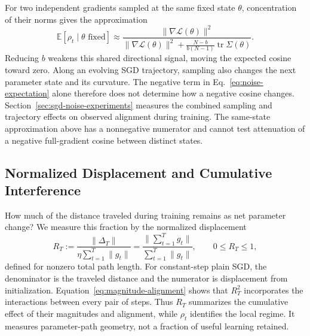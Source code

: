 For two independent gradients sampled at the same fixed state $\theta$,
concentration of their norms gives the approximation
\begin{equation}
  \mathbb E[\rho_t\mid\theta\text{ fixed}]\approx
  \frac{\|\nabla\mathcal L(\theta)\|^2}
  {\|\nabla\mathcal L(\theta)\|^2+
   \frac{N-b}{b(N-1)}\operatorname{tr}\Sigma(\theta)}.
  \label{eq:noise-cosine-approx}
\end{equation}
Reducing $b$ weakens this shared directional signal, moving the expected
cosine toward zero. Along an evolving SGD trajectory, sampling also
changes the next parameter state and its curvature. The negative term
in Eq.~\eqref{eq:noise-expectation} alone therefore does not determine
how a negative cosine changes. Section~\ref{sec:sgd-noise-experiments}
measures the combined sampling and trajectory effects on observed
alignment during training. The same-state approximation above has a
nonnegative numerator and cannot test attenuation of a negative
full-gradient cosine between distinct states.

\subsection{Normalized Displacement and Cumulative Interference}
\label{subsec:normalized-displacement}

How much of the distance traveled during training remains as net
parameter change? We measure this fraction by the normalized displacement
\begin{equation}
  R_T:=
  \frac{\|\Delta_T\|}
       {\eta\sum_{t=1}^T\|g_t\|}
  =\frac{\|\sum_{t=1}^T g_t\|}
        {\sum_{t=1}^T\|g_t\|},
  \qquad 0\leq R_T\leq1,
  \label{eq:normalized-displacement}
\end{equation}
defined for nonzero total path length. For constant-step plain SGD, the
denominator is the traveled distance and the numerator is displacement
from initialization. Equation~\eqref{eq:magnitude-alignment} shows that
$R_T^2$ incorporates the interactions between every pair of steps.
Thus $R_T$ summarizes the cumulative effect of their magnitudes and
alignment, while $\rho_t$ identifies the local regime. It measures
parameter-path geometry, not a fraction of useful learning retained.

